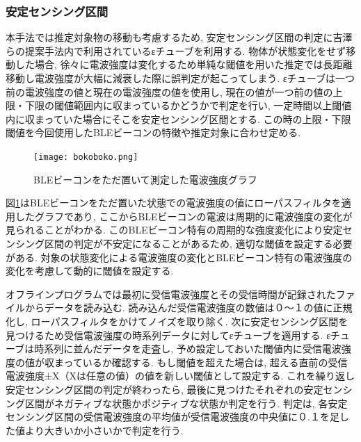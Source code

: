 \documentclass[Japanese]{dicomopapers}
\begin{document}
\subsubsection{安定センシング区間}
本手法では推定対象物の移動も考慮するため, 安定センシング区間の判定に吉澤らの提案手法\cite{ips-chube}内で利用されているεチューブを利用する.
物体が状態変化をせず移動した場合, 徐々に電波強度は変化するため単純な閾値を用いた推定では長距離移動し電波強度が大幅に減衰した際に誤判定が起こってしまう.
εチューブは一つ前の電波強度の値と現在の電波強度の値を使用し, 現在の値が一つ前の値の上限・下限の閾値範囲内に収まっているかどうかで判定を行い, 一定時間以上閾値内に収まっていた場合にそこを安定センシング区間とする.
この時の上限・下限閾値を今回使用したBLEビーコンの特徴や推定対象に合わせ定める.
\begin{figure}[ht]
    \centering
    \texttt{[image: bokoboko.png]}
    \caption{BLEビーコンをただ置いて測定した電波強度グラフ}
    \label{nomal-data}
\end{figure}

図\ref{nomal-data}はBLEビーコンをただ置いた状態での電波強度の値にローパスフィルタを適用したグラフであり, ここからBLEビーコンの電波は周期的に電波強度の変化が見られることがわかる.
このBLEビーコン特有の周期的な強度変化により安定センシング区間の判定が不安定になることがあるため, 適切な閾値を設定する必要がある.
対象の状態変化による電波強度の変化とBLEビーコン特有の電波強度の変化を考慮して動的に閾値を設定する.

オフラインプログラムでは最初に受信電波強度とその受信時間が記録されたファイルからデータを読み込む.
読み込んだ受信電波強度の数値は０〜１の値に正規化し, ローパスフィルタをかけてノイズを取り除く.
次に安定センシング区間を見つけるため受信電波強度の時系列データに対してεチューブを適用する.
εチューブは時系列に並んだデータを走査し, 予め設定しておいた閾値内に受信電波強度の値が収まっているか確認する.
もし閾値を超えた場合は, 超える直前の受信電波強度±X（Xは任意の値）の値を新しい閾値として設定する.
これを繰り返し安定センシング区間の判定が終わったら, 最後に見つけたそれぞれの安定センシング区間がネガティブな状態かポジティブな状態か判定を行う.
判定は, 各安定センシング区間の受信電波強度の平均値が受信電波強度の中央値に０.１を足した値より大きいか小さいかで判定を行う.


\end{document}
